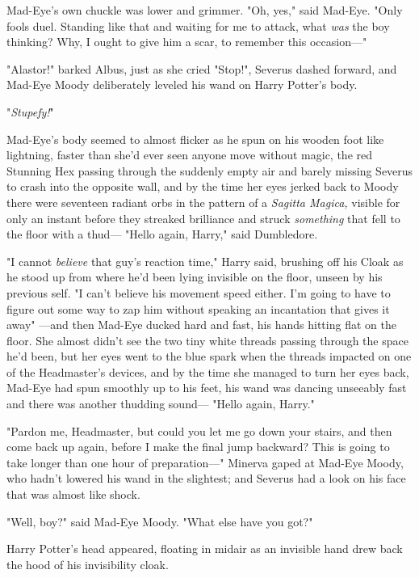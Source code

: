 Mad-Eye's own chuckle was lower and grimmer. "Oh, yes," said Mad-Eye. "Only
fools duel. Standing like that and waiting for me to attack, what \emph{was}
the boy thinking? Why, I ought to give him a scar, to remember this occasion---"

"Alastor!" barked Albus, just as she cried "Stop!", Severus dashed forward, and
Mad-Eye Moody deliberately leveled his wand on Harry Potter's body.

"\emph{Stupefy!}"

Mad-Eye's body seemed to almost flicker as he spun on his wooden foot like
lightning, faster than she'd ever seen anyone move without magic, the red
Stunning Hex passing through the suddenly empty air and barely missing Severus
to crash into the opposite wall, and by the time her eyes jerked back to Moody
there were seventeen radiant orbs in the pattern of a \emph{Sagitta Magica,}
visible for only an instant before they streaked brilliance and struck
\emph{something} that fell to the floor with a thud---
\sbreak
"Hello again, Harry," said Dumbledore.

"I cannot \emph{believe} that guy's reaction time," Harry said, brushing off
his Cloak as he stood up from where he'd been lying invisible on the floor,
unseen by his previous self. "I can't believe his movement speed either. I'm
going to have to figure out some way to zap him without speaking an incantation
that gives it away{\el}"
\sbreak
---and then Mad-Eye ducked hard and fast, his hands hitting flat on the floor.
She almost didn't see the two tiny white threads passing through the space he'd
been, but her eyes went to the blue spark when the threads impacted on one of
the Headmaster's devices, and by the time she managed to turn her eyes back,
Mad-Eye had spun smoothly up to his feet, his wand was dancing unseeably fast
and there was another thudding sound---
\sbreak
"Hello again, Harry."

"Pardon me, Headmaster, but could you let me go down your stairs, and then come
back up again, before I make the final jump backward? This is going to take
longer than one hour of preparation---"
\sbreak
Minerva gaped at Mad-Eye Moody, who hadn't lowered his wand in the slightest;
and Severus had a look on his face that was almost like shock.

"Well, boy?" said Mad-Eye Moody. "What else have you got?"

Harry Potter's head appeared, floating in midair as an invisible hand drew back
the hood of his invisibility cloak.

